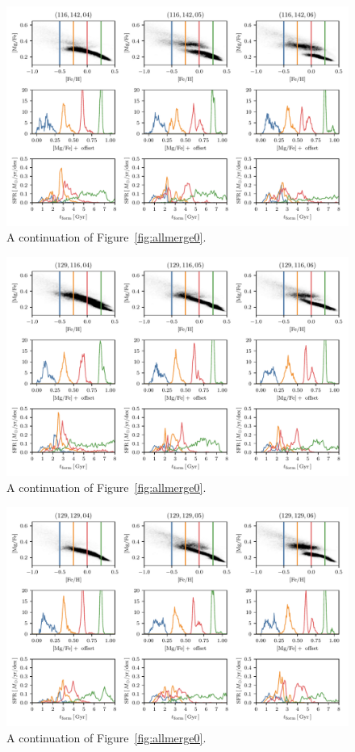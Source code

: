 \begin{appendices}
\begin{figure}
  \centering
  \includegraphics[width=\textwidth]{ch3/allmerge2.pdf}
  \caption{A continuation of Figure~\ref{fig:allmerge0}.}
  \label{fig:allmerge2}
\end{figure}

\begin{figure}
  \centering
  \includegraphics[width=\textwidth]{ch3/allmerge3.pdf}
  \caption{A continuation of Figure~\ref{fig:allmerge0}.}
  \label{fig:allmerge3}
\end{figure}

\begin{figure}
  \centering
  \includegraphics[width=\textwidth]{ch3/allmerge4.pdf}
  \caption{A continuation of Figure~\ref{fig:allmerge0}.}
  \label{fig:allmerge4}
\end{figure}


\end{appendices}
